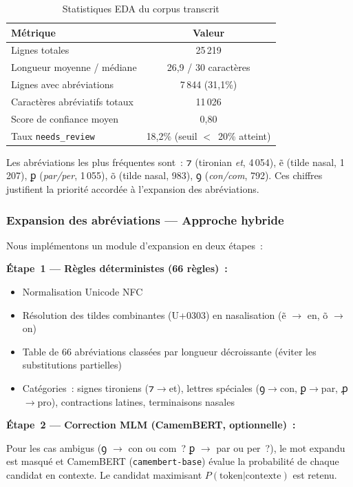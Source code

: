 \documentclass[11pt,a4paper]{article}
\begin{document}
\begin{table}[H]
\centering
\caption{Statistiques EDA du corpus transcrit}
\label{tab:eda}
\begin{tabular}{@{}lc@{}}
\toprule
\textbf{Métrique} & \textbf{Valeur} \\
\midrule
Lignes totales & 25\,219 \\
Longueur moyenne / médiane & 26,9 / 30 caractères \\
Lignes avec abréviations & 7\,844 (31,1\%) \\
Caractères abréviatifs totaux & 11\,026 \\
Score de confiance moyen & 0,80 \\
Taux \texttt{needs\_review} & 18,2\% (seuil $<$~20\% atteint) \\
\bottomrule
\end{tabular}
\end{table}

Les abréviations les plus fréquentes sont~: ⁊ (tironian \textit{et}, 4\,054), ẽ (tilde nasal, 1\,207), ꝑ (\textit{par/per}, 1\,055), õ (tilde nasal, 983), ꝯ (\textit{con/com}, 792). Ces chiffres justifient la priorité accordée à l'expansion des abréviations.

\subsubsection{Expansion des abréviations --- Approche hybride}

Nous implémentons un module d'expansion en deux étapes~:

\textbf{Étape~1 --- Règles déterministes (66 règles)~:}
\begin{itemize}[leftmargin=*, itemsep=1pt]
\item Normalisation Unicode NFC
\item Résolution des tildes combinantes (U+0303) en nasalisation (ẽ $\rightarrow$ en, õ $\rightarrow$ on)
\item Table de 66 abréviations classées par longueur décroissante (éviter les substitutions partielles)
\item Catégories~: signes tironiens (⁊$\rightarrow$et), lettres spéciales (ꝯ$\rightarrow$con, ꝑ$\rightarrow$par, ꝓ$\rightarrow$pro), contractions latines, terminaisons nasales
\end{itemize}

\textbf{Étape~2 --- Correction MLM (CamemBERT, optionnelle)~:}

Pour les cas ambigus (ꝯ $\rightarrow$ con ou com~? ꝑ $\rightarrow$ par ou per~?), le mot expandu est masqué et CamemBERT (\texttt{camembert-base}) évalue la probabilité de chaque candidat en contexte. Le candidat maximisant $P(\text{token}|\text{contexte})$ est retenu.
\end{document}
